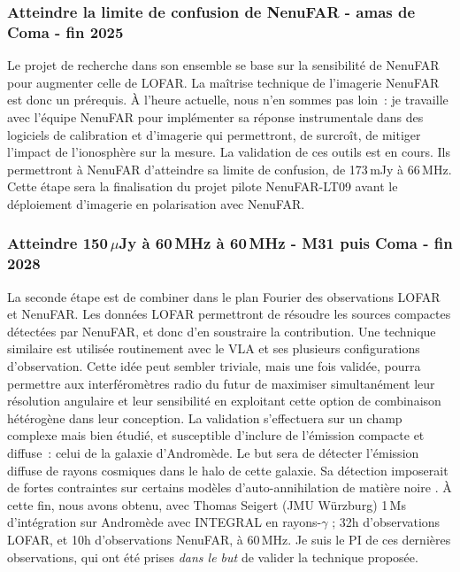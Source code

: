 

\subsubsection{Atteindre la limite de confusion de NenuFAR - amas de Coma - fin 2025}

\pg
Le projet de recherche dans son ensemble se base sur la sensibilit\'e de NenuFAR pour augmenter celle de LOFAR. La ma\^itrise technique de l'imagerie NenuFAR est donc un pr\'erequis. \`A l'heure actuelle, nous n'en sommes pas loin~: je travaille avec l'\'equipe NenuFAR pour impl\'ementer sa r\'eponse instrumentale dans des logiciels de calibration et d'imagerie qui permettront, de surcro\^it, de mitiger l'impact de l'ionosph\`ere sur la mesure. La validation de ces outils est en cours. Ils permettront \`a NenuFAR d'atteindre sa limite de confusion, de 173\,mJy \`a 66\,MHz. Cette \'etape sera la finalisation du projet pilote NenuFAR-LT09 avant le d\'eploiement d'imagerie en polarisation avec NenuFAR. %

\subsubsection{Atteindre  150\,$\mu$Jy \`a 60\,MHz \`a 60\,MHz - M31 puis Coma - fin 2028}

\pg
La seconde \'etape est de combiner dans le plan Fourier des observations LOFAR et NenuFAR. Les donn\'ees LOFAR permettront de r\'esoudre les sources compactes d\'etect\'ees par NenuFAR, et donc d'en soustraire la contribution. Une technique similaire est utilis\'ee routinement avec le VLA \citep{1980ApJS...44..151T} et ses plusieurs configurations d'observation. Cette id\'ee peut sembler triviale, mais une fois valid\'ee, pourra permettre aux interf\'erom\`etres radio du futur de maximiser simultan\'ement leur r\'esolution angulaire et leur sensibilit\'e en exploitant cette option de combinaison h\'et\'erog\`ene dans leur conception. La validation s'effectuera sur un champ complexe mais bien \'etudi\'e, et susceptible d'inclure de l'\'emission compacte et diffuse~: celui de la galaxie d'Androm\`ede. Le but sera de d\'etecter l'\'emission diffuse de rayons cosmiques dans le halo de cette galaxie. Sa d\'etection imposerait de fortes contraintes sur certains mod\`eles d'auto-annihilation de mati\`ere noire \citep[e.g.][]{2016JCAP...11..021L,2022PhRvL.129k1103M}. \`A cette fin, nous avons obtenu, avec Thomas Seigert (JMU W\"urzburg) 1\,Ms d'int\'egration sur Androm\`ede avec INTEGRAL en rayons-$\gamma$ \citep{2003A&A...411L...1W}; 32h d'observations LOFAR, et 10h d'observations NenuFAR, \`a 60\,MHz. Je suis le PI de ces derni\`eres observations, qui ont \'et\'e prises \textit{dans le but} de valider la technique propos\'ee.%

